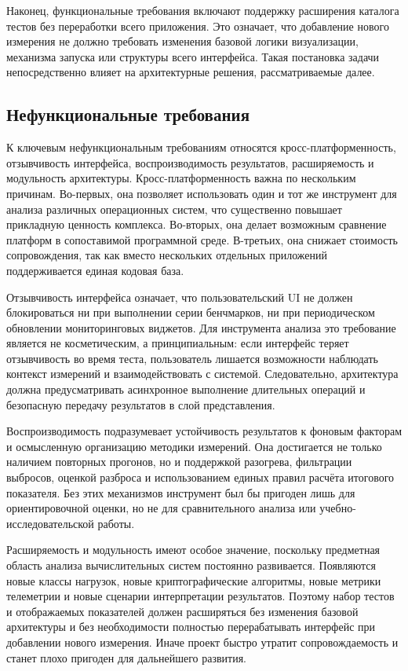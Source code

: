 Наконец, функциональные требования включают поддержку расширения каталога тестов без переработки всего приложения. Это означает, что добавление нового измерения не должно требовать изменения базовой логики визуализации, механизма запуска или структуры всего интерфейса. Такая постановка задачи непосредственно влияет на архитектурные решения, рассматриваемые далее.

\subsection{Нефункциональные требования}

К ключевым нефункциональным требованиям относятся кросс-платформенность, отзывчивость интерфейса, воспроизводимость результатов, расширяемость и модульность архитектуры. Кросс-платформенность важна по нескольким причинам. Во-первых, она позволяет использовать один и тот же инструмент для анализа различных операционных систем, что существенно повышает прикладную ценность комплекса. Во-вторых, она делает возможным сравнение платформ в сопоставимой программной среде. В-третьих, она снижает стоимость сопровождения, так как вместо нескольких отдельных приложений поддерживается единая кодовая база.

Отзывчивость интерфейса означает, что пользовательский UI не должен блокироваться ни при выполнении серии бенчмарков, ни при периодическом обновлении мониторинговых виджетов. Для инструмента анализа это требование является не косметическим, а принципиальным: если интерфейс теряет отзывчивость во время теста, пользователь лишается возможности наблюдать контекст измерений и взаимодействовать с системой. Следовательно, архитектура должна предусматривать асинхронное выполнение длительных операций и безопасную передачу результатов в слой представления.

Воспроизводимость подразумевает устойчивость результатов к фоновым факторам и осмысленную организацию методики измерений. Она достигается не только наличием повторных прогонов, но и поддержкой разогрева, фильтрации выбросов, оценкой разброса и использованием единых правил расчёта итогового показателя. Без этих механизмов инструмент был бы пригоден лишь для ориентировочной оценки, но не для сравнительного анализа или учебно-исследовательской работы.

Расширяемость и модульность имеют особое значение, поскольку предметная область анализа вычислительных систем постоянно развивается. Появляются новые классы нагрузок, новые криптографические алгоритмы, новые метрики телеметрии и новые сценарии интерпретации результатов. Поэтому набор тестов и отображаемых показателей должен расширяться без изменения базовой архитектуры и без необходимости полностью перерабатывать интерфейс при добавлении нового измерения. Иначе проект быстро утратит сопровождаемость и станет плохо пригоден для дальнейшего развития.

